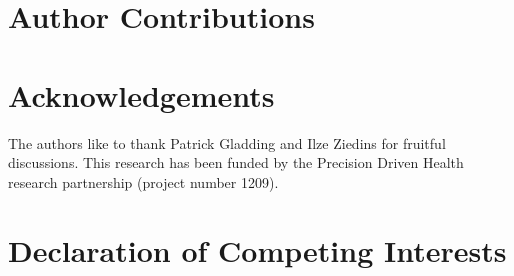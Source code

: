 \documentclass{elsarticle}
\begin{document}
\linenumbers



\section*{Author Contributions}


\section*{Acknowledgements}
The authors like to thank Patrick Gladding and Ilze Ziedins for fruitful
discussions.
This research has been funded by the Precision Driven Health research partnership (project number 1209).


\section*{Declaration of Competing Interests}


%

\end{document}
